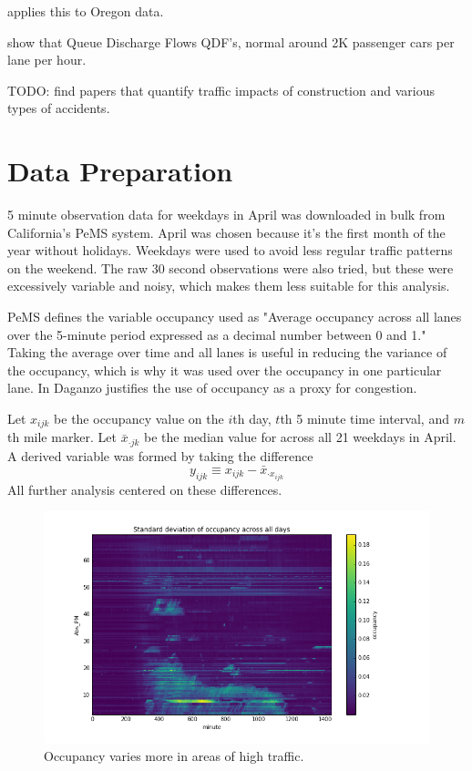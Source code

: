 \documentclass[12pt]{article}
\begin{document}
\cite{wieczorek2010techniques} applies this to Oregon data.

\cite{zhang2004some} show that Queue Discharge Flows QDF's, normal around 2K
passenger cars per lane per hour.

TODO: find papers that quantify traffic impacts of construction and various
types of accidents.

\section{Data Preparation}

5 minute observation data for weekdays in April was downloaded in bulk from
California's PeMS system. April was chosen because it's the first month of
the year without holidays. Weekdays were used to avoid less regular traffic
patterns on the weekend.  The raw 30 second observations were also tried,
but these were excessively variable and noisy, which makes them less
suitable for this analysis.

PeMS defines the variable occupancy used as "Average occupancy across all lanes over
the 5-minute period expressed as a decimal number between 0 and 1." Taking
the average over time and all lanes is useful in reducing the variance of
the occupancy, which is why it was used over the occupancy in one
particular lane. In \cite{daganzo1997fundamentals} Daganzo justifies the
use of occupancy as a proxy for congestion. 

Let $x_{ijk}$ be the occupancy value on the $i$th day, $t$th 5 minute time
interval, and $m$th mile marker. Let $\bar{x}_{\cdot jk}$ be the median
value for across all 21 weekdays in April. 
A derived variable was formed by taking the difference
\begin{equation}
    \label{eq:diff}
    y_{ijk} \equiv x_{ijk} - \bar{x}_{\cdot x_{ijk}}
\end{equation}
All further analysis centered on these differences.

\begin{figure}
    \label{fig:occ_sd}
    \centering
    \includegraphics[scale=0.5]{../occ_sd.png}
    \caption{Occupancy varies more in areas of high traffic.}
\end{figure}
\end{document}
